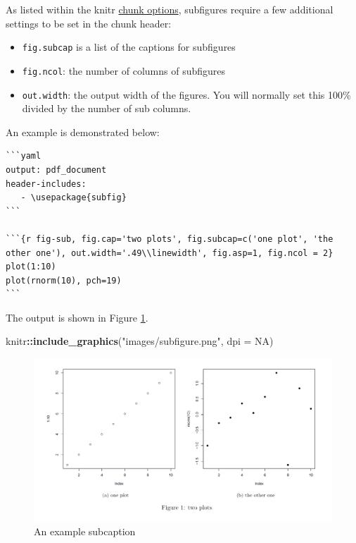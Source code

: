 \documentclass[]{book}
\newenvironment{Shaded}{\begin{snugshade}}{\end{snugshade}}
\newcommand{\KeywordTok}[1]{\textcolor[rgb]{0.13,0.29,0.53}{\textbf{#1}}}
\newcommand{\DataTypeTok}[1]{\textcolor[rgb]{0.13,0.29,0.53}{#1}}
\newcommand{\StringTok}[1]{\textcolor[rgb]{0.31,0.60,0.02}{#1}}
\newcommand{\OtherTok}[1]{\textcolor[rgb]{0.56,0.35,0.01}{#1}}
\newcommand{\OperatorTok}[1]{\textcolor[rgb]{0.81,0.36,0.00}{\textbf{#1}}}
\newcommand{\NormalTok}[1]{#1}
\providecommand{\tightlist}{%
  \setlength{\itemsep}{0pt}\setlength{\parskip}{0pt}}
\theoremstyle{definition}
\theoremstyle{definition}
\theoremstyle{definition}
\theoremstyle{remark}
\begin{document}
As listed within the knitr
\href{https://yihui.name/knitr/options/}{chunk options}, subfigures
require a few additional settings to be set in the chunk header:

\begin{itemize}
\tightlist
\item
  \texttt{fig.subcap} is a list of the captions for subfigures
\item
  \texttt{fig.ncol}: the number of columns of subfigures
\item
  \texttt{out.width}: the output width of the figures. You will normally
  set this 100\% divided by the number of sub columns.
\end{itemize}

An example is demonstrated below:

\begin{verbatim}
```yaml
output: pdf_document
header-includes:
   - \usepackage{subfig}
```

```{r fig-sub, fig.cap='two plots', fig.subcap=c('one plot', 'the other one'), out.width='.49\\linewidth', fig.asp=1, fig.ncol = 2}
plot(1:10)
plot(rnorm(10), pch=19)
```
\end{verbatim}

The output is shown in Figure \ref{fig:subcaptions}.

\begin{Shaded}
\begin{Highlighting}[]
\NormalTok{knitr}\OperatorTok{::}\KeywordTok{include_graphics}\NormalTok{(}\StringTok{"images/subfigure.png"}\NormalTok{, }\DataTypeTok{dpi =} \OtherTok{NA}\NormalTok{)}
\end{Highlighting}
\end{Shaded}

\begin{figure}
\centering
\includegraphics{images/subfigure.png}
\caption{\label{fig:subcaptions}An example subcaption}
\end{figure}
\end{document}
